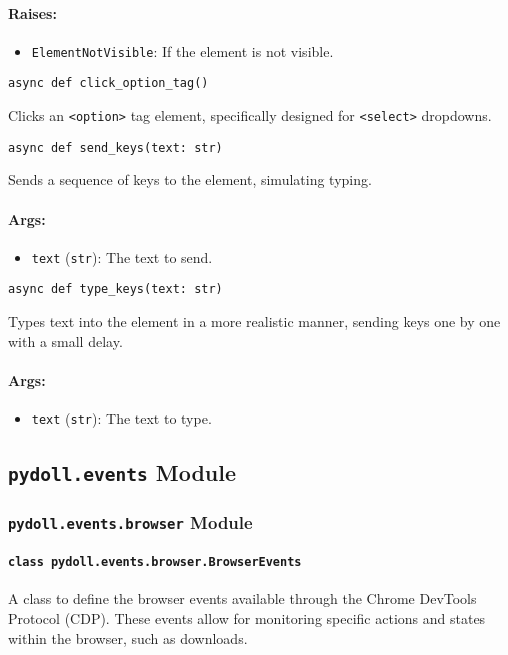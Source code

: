 \documentclass{article}
\begin{document}
\paragraph{Raises:}
\begin{itemize}
    \item \texttt{ElementNotVisible}: If the element is not visible.
\end{itemize}

\noindent\texttt{async def click\_option\_tag()}

\noindent Clicks an \texttt{<option>} tag element, specifically designed for \texttt{<select>} dropdowns.

\noindent\texttt{async def send\_keys(text: str)}

\noindent Sends a sequence of keys to the element, simulating typing.

\paragraph{Args:}
\begin{itemize}
    \item \texttt{text} (\texttt{str}): The text to send.
\end{itemize}

\noindent\texttt{async def type\_keys(text: str)}

\noindent Types text into the element in a more realistic manner, sending keys one by one with a small delay.

\paragraph{Args:}
\begin{itemize}
    \item \texttt{text} (\texttt{str}): The text to type.
\end{itemize}

\hrulefill

\subsection*{\texttt{pydoll.events} Module}

\subsubsection*{\texttt{pydoll.events.browser} Module}

\paragraph*{\texttt{class pydoll.events.browser.BrowserEvents}}
\noindent A class to define the browser events available through the Chrome DevTools Protocol (CDP). These events allow for monitoring specific actions and states within the browser, such as downloads.
\end{document}
